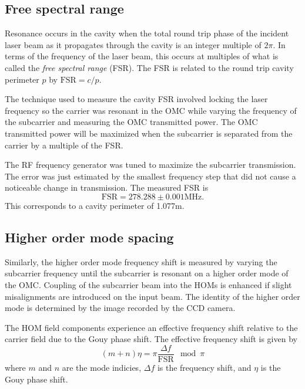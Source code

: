 \subsection{Free spectral range}
\label{sec:FSR}
Resonance occurs in the cavity when the total round trip phase of the incident laser beam as it propagates through the cavity is an integer multiple of $2\pi$. %
In terms of the frequency of the laser beam, this occurs at multiples of what is called the \emph{free spectral range} (FSR). %
The FSR is related to the round trip cavity perimeter $p$ by $\mathrm{FSR}=c/p$.

The technique used to measure the cavity FSR involved locking the laser frequency so the carrier was resonant in the OMC while varying the frequency of the subcarrier and measuring the OMC transmitted power. %
The OMC transmitted power will be maximized when the subcarrier is separated from the carrier by a multiple of the FSR.

The RF frequency generator was tuned to maximize the subcarrier transmission. %
The error was just estimated by the smallest frequency step that did not cause a noticeable change in transmission. %
The measured FSR is
\begin{equation}
\mathrm{FSR}=278.288\pm0.001\text{MHz}.
\end{equation}
This corresponds to a cavity perimeter of 1.077m.

\subsection{Higher order mode spacing}
Similarly, the higher order mode frequency shift is measured by varying the subcarrier frequency until the subcarrier is resonant on a higher order mode of the OMC. %
Coupling of the subcarrier beam into the HOMs is enhanced if slight misalignments are introduced on the input beam. %
The identity of the higher order mode is determined by the image recorded by the CCD camera.

The HOM field components experience an effective frequency shift relative to the  carrier field due to the Gouy phase shift. %
The effective frequency shift is given by
\begin{equation}
\label{eqn:gouyshift}
(m+n)\eta=\pi\frac{\Delta f}{\mathrm{FSR}}\mod \pi
\end{equation}
where $m$ and $n$ are the  mode indicies, $\Delta f$ is the frequency shift, and $\eta$ is the Gouy phase shift. %



